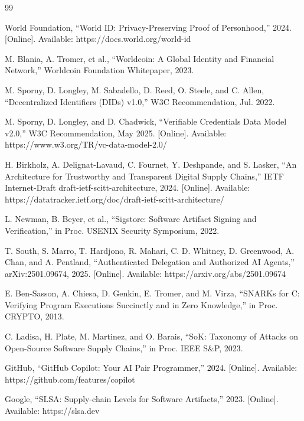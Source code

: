 \documentclass[conference]{IEEEtran}
\begin{document}
\begin{thebibliography}{99}

World Foundation, ``World ID: Privacy-Preserving Proof of Personhood,'' 2024. [Online]. Available: https://docs.world.org/world-id

M. Blania, A. Tromer, et al., ``Worldcoin: A Global Identity and Financial Network,'' Worldcoin Foundation Whitepaper, 2023.

M. Sporny, D. Longley, M. Sabadello, D. Reed, O. Steele, and C. Allen, ``Decentralized Identifiers (DIDs) v1.0,'' W3C Recommendation, Jul. 2022.

M. Sporny, D. Longley, and D. Chadwick, ``Verifiable Credentials Data Model v2.0,'' W3C Recommendation, May 2025. [Online]. Available: https://www.w3.org/TR/vc-data-model-2.0/

H. Birkholz, A. Delignat-Lavaud, C. Fournet, Y. Deshpande, and S. Lasker, ``An Architecture for Trustworthy and Transparent Digital Supply Chains,'' IETF Internet-Draft draft-ietf-scitt-architecture, 2024. [Online]. Available: https://datatracker.ietf.org/doc/draft-ietf-scitt-architecture/

L. Newman, B. Beyer, et al., ``Sigstore: Software Artifact Signing and Verification,'' in Proc. USENIX Security Symposium, 2022.

T. South, S. Marro, T. Hardjono, R. Mahari, C. D. Whitney, D. Greenwood, A. Chan, and A. Pentland, ``Authenticated Delegation and Authorized AI Agents,'' arXiv:2501.09674, 2025. [Online]. Available: https://arxiv.org/abs/2501.09674

E. Ben-Sasson, A. Chiesa, D. Genkin, E. Tromer, and M. Virza, ``SNARKs for C: Verifying Program Executions Succinctly and in Zero Knowledge,'' in Proc. CRYPTO, 2013.

C. Ladisa, H. Plate, M. Martinez, and O. Barais, ``SoK: Taxonomy of Attacks on Open-Source Software Supply Chains,'' in Proc. IEEE S\&P, 2023.

GitHub, ``GitHub Copilot: Your AI Pair Programmer,'' 2024. [Online]. Available: https://github.com/features/copilot

Google, ``SLSA: Supply-chain Levels for Software Artifacts,'' 2023. [Online]. Available: https://slsa.dev

\end{thebibliography}
\end{document}
